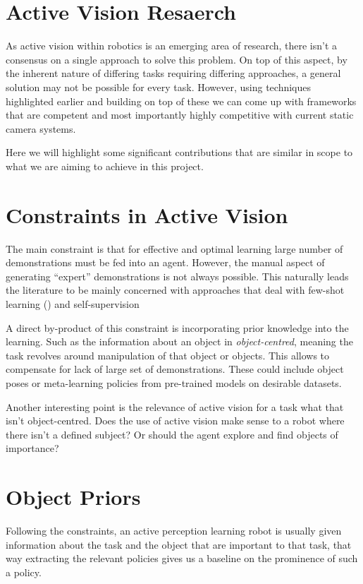 \section{Active Vision Resaerch}

As active vision within robotics is an emerging area of research, there isn't a consensus on a single approach to solve this problem. On top of this aspect, by the inherent nature of differing tasks requiring differing approaches, a general solution may not be possible for every task. However, using techniques highlighted earlier and building on top of these we can come up with frameworks that are competent and most importantly highly competitive with current static camera systems.

Here we will highlight some significant contributions that are similar in scope to what we are aiming to achieve in this project.


\section{Constraints in Active Vision}
The main constraint is that for effective and optimal learning large number of demonstrations must be fed into an agent. However, the manual aspect of generating ``expert'' demonstrations is not always possible. This naturally leads the literature to be mainly concerned with approaches that deal with few-shot learning () and self-supervision

A direct by-product of this constraint is incorporating prior knowledge into the learning. Such as the information about an object in \emph{object-centred}, meaning the task revolves around manipulation of that object or objects. This allows to compensate for lack of large set of demonstrations. These could include object poses or meta-learning policies from pre-trained models on desirable datasets.

Another interesting point is the relevance of active vision for a task what that isn't object-centred. 
Does the use of active vision make sense to a robot where there isn't a defined subject? Or should the agent explore and find objects of importance?

\section{Object Priors}
Following the constraints, an active perception learning robot is usually given information about the task and the object that are important to that task, that way extracting the relevant policies gives us a baseline on the prominence of such a policy.

